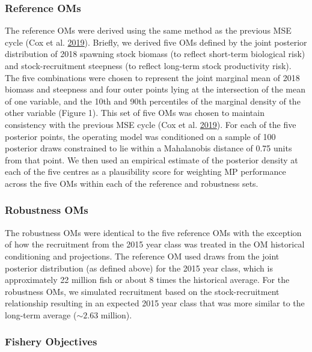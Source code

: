 \documentclass[11pt]{book}
\begin{document}
\hypertarget{reference-oms}{%
\subsubsection{Reference OMs}\label{reference-oms}}

The reference OMs were derived using the same method as the previous MSE cycle (Cox et al. \protect\hyperlink{ref-cox2019evaluating}{2019}). Briefly, we derived five OMs defined by the joint posterior distribution of 2018 spawning stock biomass (to reflect short-term biological risk) and stock-recruitment steepness (to reflect long-term stock productivity risk). The five combinations were chosen to represent the joint marginal mean of 2018 biomass and steepness and four outer points lying at the intersection of the mean of one variable, and the 10th and 90th percentiles of the marginal density of the other variable (Figure 1). This set of five OMs was chosen to maintain consistency with the previous MSE cycle (Cox et al. \protect\hyperlink{ref-cox2019evaluating}{2019}). For each of the five posterior points, the operating model was conditioned on a sample of 100 posterior draws constrained to lie within a Mahalanobis distance of 0.75 units from that point. We then used an empirical estimate of the posterior density at each of the five centres as a plausibility score for weighting MP performance across the five OMs within each of the reference and robustness sets.

\hypertarget{robustness-oms}{%
\subsubsection{Robustness OMs}\label{robustness-oms}}

The robustness OMs were identical to the five reference OMs with the exception of how the recruitment from the 2015 year class was treated in the OM historical conditioning and projections. The reference OM used draws from the joint posterior distribution (as defined above) for the 2015 year class, which is approximately 22 million fish or about 8 times the historical average. For the robustness OMs, we simulated recruitment based on the stock-recruitment relationship resulting in an expected 2015 year class that was more similar to the long-term average (\(\sim 2.63\) million).

\hypertarget{fishery-objectives}{%
\subsubsection{Fishery Objectives}\label{fishery-objectives}}
\end{document}
